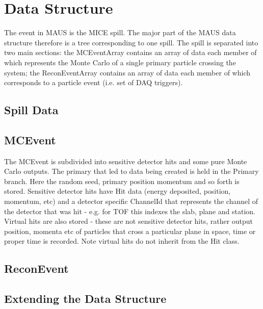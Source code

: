 \section{Data Structure}
The event in MAUS is the MICE spill. The major part of the MAUS data structure therefore is a tree corresponding to one spill. The spill is separated into two main sections: the MCEventArray contains an array of data each member of which represents the Monte Carlo of a single primary particle crossing the system; the ReconEventArray contains an array of data each member of which corresponds to a particle event (i.e. set of DAQ triggers).

\subsection{Spill Data}

\subsection{MCEvent}
The MCEvent is subdivided into sensitive detector hits and some pure Monte Carlo outputs. The primary that led to data being created is held in the Primary branch. Here the random seed, primary position momentum and so forth is stored. Sensitive detector hits have Hit data (energy deposited, position, momentum, etc) and a detector specific ChannelId that represents the channel of the detector that was hit - e.g. for TOF this indexes the slab, plane and station. Virtual hits are also stored - these are not sensitive detector hits, rather output position, momenta etc of particles that cross a particular plane in space, time or proper time is recorded. Note virtual hits do not inherit from the Hit class.

\subsection{ReconEvent}

\subsection{Extending the Data Structure}



